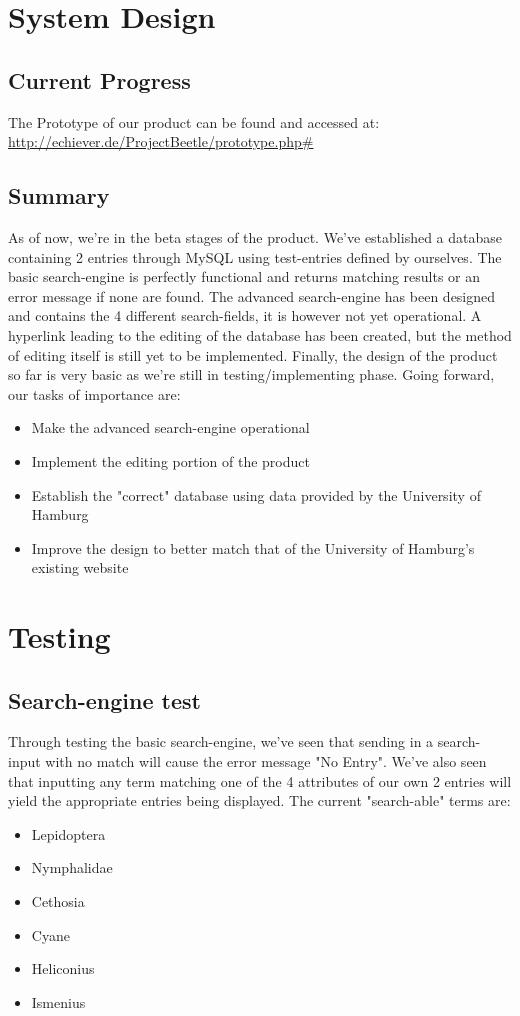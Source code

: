 \documentclass[12pt,a4paper]{article}
\begin{document}
\newpage

\section{System Design}
\subsection{Current Progress}

The Prototype of our product can be found and accessed at: \url{http://echiever.de/ProjectBeetle/prototype.php#}
\subsection{Summary}

As of now, we're in the beta stages of the product. We've established a database containing 2 entries through MySQL using test-entries defined by ourselves. 
The basic search-engine is perfectly functional and returns matching results or an error message if none are found.
The advanced search-engine has been designed and contains the 4 different search-fields, it is however not yet operational.
A hyperlink leading to the editing of the database has been created, but the method of editing itself is still yet to be implemented.
Finally, the design of the product so far is very basic as we're still in testing/implementing phase.
Going forward, our tasks of importance are:
\begin{itemize}
\item Make the advanced search-engine operational
\item Implement the editing portion of the product
\item Establish the "correct" database using data provided by the University of Hamburg
\item Improve the design to better match that of the University of Hamburg's existing website
\end{itemize}

\section{Testing}
\subsection{Search-engine test}

Through testing the basic search-engine, we've seen that sending in a search-input with no match will cause the error message "No Entry".
We've also seen that inputting any term matching one of the 4 attributes of our own 2 entries will yield the appropriate entries being displayed. 
The current "search-able" terms are:
\begin{itemize}
	\item Lepidoptera
	\item Nymphalidae
	\item Cethosia
	\item Cyane 
	\item Heliconius
	\item Ismenius
\end{itemize}
\newpage
\end{document}

